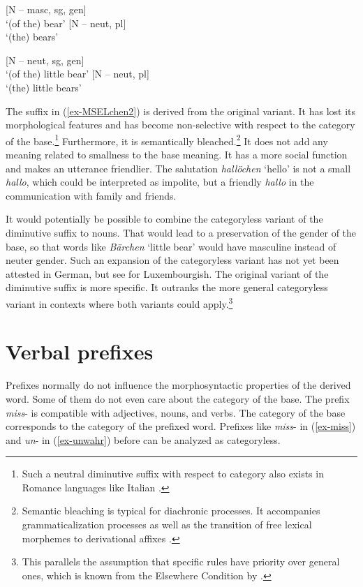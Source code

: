 \documentclass[output=paper
  ,nobabel
  ,draftmode
  ,colorlinks, citecolor=brown
]{langscibook}
\begin{document}
\eal\label{bär}
\ex {} [N – masc, sg, gen{}]\\`(of the) bear' 
\ex {} [N – neut, pl{}]\\ `(the) bears'
\zl

\eal\label{bär-b} 
\ex {} [N – neut, sg, gen]\\ `(of the) little bear'
\ex {} [N – neut, pl]\\ `(the) little bears'
\zl

\noindent The suffix in (\ref{ex-MSELchen2}) is derived from the original variant. It has lost its morphological features and has become non-selective with respect to the category of the base.\footnote{Such a neutral diminutive suffix with respect to category also exists in Romance languages like Italian \citep[cf.\ e.g.][]{Scalise1988}.}  Furthermore, it is semantically bleached.\footnote{Semantic bleaching is typical for diachronic processes. It accompanies grammaticalization processes \citep[cf.][Section~3.2]{Szczepaniak2009} as well as the transition of free lexical morphemes to derivational affixes \citep[cf.][Section~2]{NueblingEtAl2010}.} It does not add any meaning related to smallness to the base meaning. It has a more social function and makes an utterance friendlier. The salutation \emph{hallöchen} `hello' is not a small \emph{hallo}, which could be interpreted as impolite, but a friendly \emph{hallo} in the communication with family and friends. 

It would potentially be possible to combine the categoryless variant of the diminutive suffix to nouns. That would lead to a preservation of the gender of the base, so that words like \emph{Bärchen} `little bear' would have masculine instead of neuter gender. Such an expansion of the categoryless variant has not yet been attested in German, but see \citet{Edelhoff2017} for Luxembourgish. The original variant of the diminutive suffix is more specific. It outranks the more general categoryless variant in contexts where both variants could apply.\footnote{This parallels the assumption that specific rules have priority over general ones, which is known from the Elsewhere Condition by \citet{Kiparsky1973}.}

\section{Verbal prefixes}\label{sec-verbpre}

Prefixes normally do not influence the morphosyntactic properties of the derived word. Some of them do not even care about the category of the base. The prefix \emph{miss}{}- is compatible with adjectives, nouns, and verbs. The category of the base corresponds to the category of the prefixed word. Prefixes like \emph{miss}{}- in (\ref{ex-miss}) and \emph{un}- in (\ref{ex-unwahr}) before can be analyzed as categoryless.
\end{document}
